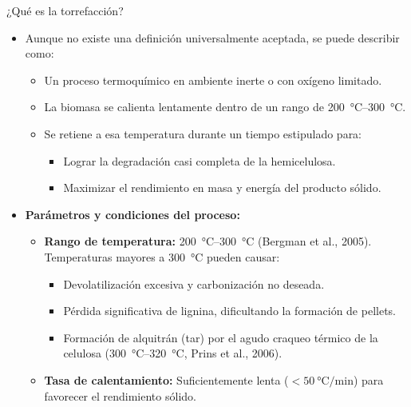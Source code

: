 \documentclass[main.tex]{subfiles}
\begin{document}
\begin{frame}{¿Qué es la torrefacción?}
  \begin{itemize}
    \item Aunque no existe una definición universalmente aceptada, se puede describir como:
      \begin{itemize}
        \item Un proceso termoquímico en ambiente inerte o con oxígeno limitado.
        \item La biomasa se calienta lentamente dentro de un rango de \SIrange{200}{300}{\celsius}.
        \item Se retiene a esa temperatura durante un tiempo estipulado para:
          \begin{itemize}
            \item Lograr la degradación casi completa de la hemicelulosa.
            \item Maximizar el rendimiento en masa y energía del producto sólido.
          \end{itemize}
      \end{itemize}
    \item \textbf{Parámetros y condiciones del proceso:}
      \begin{itemize}
        \item \textbf{Rango de temperatura:} \SIrange{200}{300}{\celsius} (Bergman et al., 2005).
              Temperaturas mayores a \SI{300}{\celsius} pueden causar:
          \begin{itemize}
            \item Devolatilización excesiva y carbonización no deseada.
            \item Pérdida significativa de lignina, dificultando la formación de pellets.
            \item Formación de alquitrán (tar) por el agudo craqueo térmico de la celulosa (\SIrange{300}{320}{\celsius}, Prins et al., 2006).
          \end{itemize}
        \item \textbf{Tasa de calentamiento:} Suficientemente lenta ($< \SI{50}{\celsius\per\minute}$) para favorecer el rendimiento sólido.
      \end{itemize}
    \end{itemize}
\end{frame}
\end{document}
